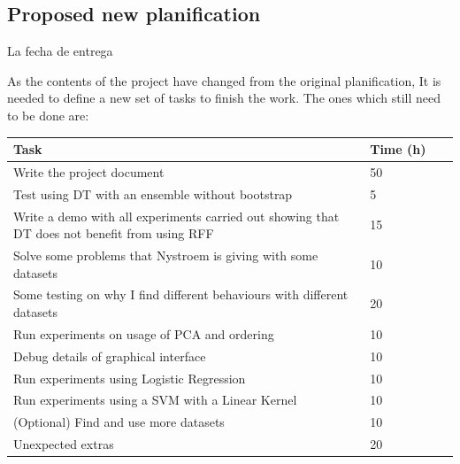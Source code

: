 \documentclass{article}
\begin{document}
    \subsection{Proposed new planification}
    La fecha de entrega

    As the contents of the project have changed from the original planification,
    It is needed to define a new set of tasks to finish the work. The ones which
    still need to be done are:

    \begin{table}[H]
\begin{tabular}{|p{0.8\linewidth}|p{0.2\linewidth}|}
\hline
\textbf{Task} & \textbf{Time (h)} \\ \hline
Write the project document & 50\\\hline
Test using DT with an ensemble without bootstrap& 5\\ \hline
Write a demo with all experiments carried out showing that DT does
not benefit from using RFF & 15\\ \hline
Solve some problems that Nystroem is giving with some datasets& 10\\ \hline
Some testing on why I find different behaviours with different
datasets& 20\\ \hline
Run experiments on usage of PCA and ordering& 10\\ \hline
Debug details of graphical interface& 10\\ \hline
Run experiments using Logistic Regression& 10\\ \hline
Run experiments using a SVM with a Linear Kernel& 10\\ \hline
(Optional) Find and use more datasets& 10\\ \hline
Unexpected extras& 20\\ \hline


\end{tabular}
\end{table}
\end{document}
